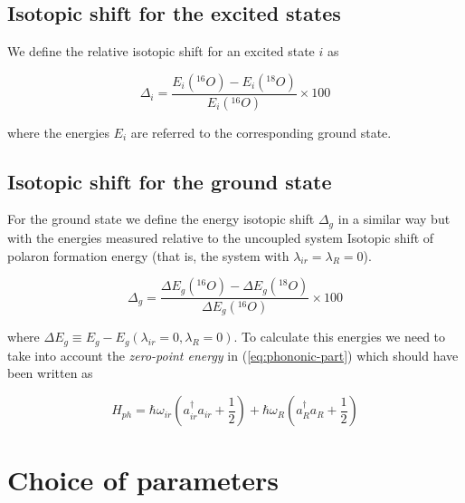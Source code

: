 \subsection{Isotopic shift for the excited states}

We define the relative isotopic shift for an excited state $i$ as 

\begin{equation}\label{eq:isot-shift-def-exc}
\Delta_i = \frac{E_i(^{16}O)- E_i(^{18}O)}{E_i(^{16}O)} \times 100
\end{equation}

where the energies $E_i$ are referred to the corresponding ground state.

\subsection{Isotopic shift for the ground state}

For the ground state we define the energy isotopic shift $\Delta_g$ in a similar way but with the energies measured relative to the uncoupled system Isotopic shift of polaron formation energy (that is, the system with $\lambda_{ir}=\lambda_R=0$).

\begin{equation}\label{eq:isot-shift-def-grd}
\Delta_g = \frac{\Delta E_g(^{16}O)- \Delta E_g(^{18}O)}{\Delta E_g(^{16}O)} \times 100
\end{equation}

where $\Delta E_g \equiv E_g - E_g(\lambda_{ir}=0, \lambda_R=0)$. To calculate this energies we need to take into account the \textit{zero-point energy} in (\ref{eq:phononic-part}) which should have been written as 

\begin{equation}\label{eq:phononic-part-complete}
H_{ph} = \hbar \omega_{ir} \left( a_{ir}^\dagger a_{ir} + \frac{1}{2}\right) + \hbar \omega_R\left( a_R^\dagger a_R + \frac{1}{2} \right)
\end{equation}


\section{Choice of parameters}

